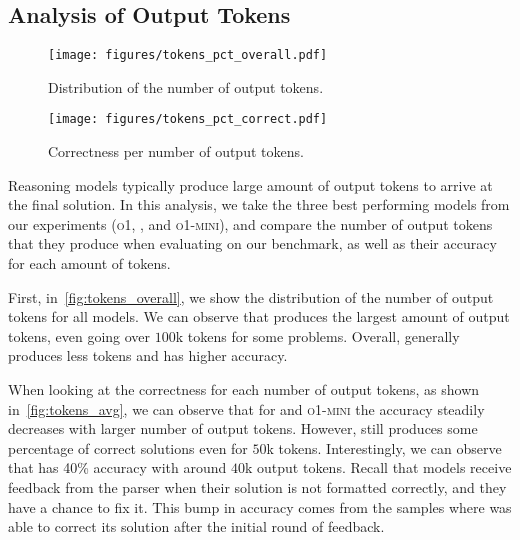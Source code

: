 \subsection{Analysis of Output Tokens} \label{app:tokens}

\begin{figure}[!hbt]
    \centering
    \begin{minipage}{0.48\textwidth}
        \centering
        \texttt{[image: figures/tokens\_pct\_overall.pdf]}
        \vspace{-6mm}
        \caption{Distribution of the number of output tokens.}
        \label{fig:tokens_overall}
    \end{minipage}
    \hfill
    \begin{minipage}{0.48\textwidth}
        \centering
        \texttt{[image: figures/tokens\_pct\_correct.pdf]}
        \vspace{-6mm}
        \caption{Correctness per number of output tokens.}
        \label{fig:tokens_avg}
    \end{minipage}
    \label{fig:tokens}
\end{figure}

Reasoning models typically produce large amount of output tokens to arrive at the final solution.
In this analysis, we take the three best performing models from our experiments (\textsc{o1}, \geminithink, and \textsc{o1-mini}), and compare the number of output tokens that they produce when evaluating on our benchmark, as well as their accuracy for each amount of tokens.

First, in~\cref{fig:tokens_overall}, we show the distribution of the number of output tokens for all models.
We can observe that \geminithink{} produces the largest amount of output tokens, even going over $100$k tokens for some problems.
Overall, \oone{} generally produces less tokens and has higher accuracy.

When looking at the correctness for each number of output tokens, as shown in~\cref{fig:tokens_avg}, we can observe that for \geminithink{} and \textsc{o1-mini} the accuracy steadily decreases with larger number of output tokens. However, \geminithink{} still produces some percentage of correct solutions even for $50$k tokens. 
Interestingly, we can observe that \oone{} has 40\% accuracy with around $40$k output tokens. Recall that models receive feedback from the parser when their solution is not formatted correctly, and they have a chance to fix it.
This bump in accuracy comes from the samples where \oone{} was able to correct its solution after the initial round of feedback.
